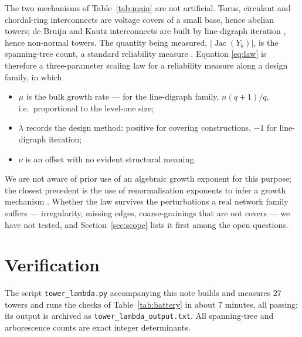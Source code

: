 \documentclass[11pt]{article}
\theoremstyle{plain}
\theoremstyle{remark}
\newcommand{\Jac}{\operatorname{Jac}}
\begin{document}
The two mechanisms of Table~\ref{tab:main} are not artificial. Torus, circulant and
chordal-ring interconnects are voltage covers of a small base, hence abelian towers; de
Bruijn and Kautz interconnects are built by line-digraph iteration \cite{FAY83,FYA84,FL92},
hence non-normal towers. The quantity being measured, $|\Jac(Y_k)|$, is the spanning-tree
count, a standard reliability measure \cite{Boesch86,Colbourn87,BH09}. Equation
\eqref{eq:law} is therefore a three-parameter scaling law for a reliability measure along a
design family, in which
\begin{itemize}
\item $\mu$ is the bulk growth rate --- for the line-digraph family, $n(q{+}1)/q$, i.e.\
proportional to the level-one size;
\item $\lambda$ records the design method: positive for covering constructions, $-1$ for
line-digraph iteration;
\item $\nu$ is an offset with no evident structural meaning.
\end{itemize}
We are not aware of prior use of an algebraic growth exponent for this purpose; the closest
precedent is the use of renormalisation exponents to infer a growth mechanism
\cite{SHM06}. Whether the law survives the perturbations a real network family suffers ---
irregularity, missing edges, coarse-grainings that are not covers --- we have not tested,
and Section~\ref{sec:scope} lists it first among the open questions.

\section{Verification}\label{sec:battery}

The script \texttt{tower\_lambda.py} accompanying this note builds and measures $27$ towers
and runs the checks of Table~\ref{tab:battery} in about $7$ minutes, all passing; its output
is archived as \texttt{tower\_lambda\_output.txt}. All spanning-tree and arborescence counts
are exact integer determinants.
\end{document}
